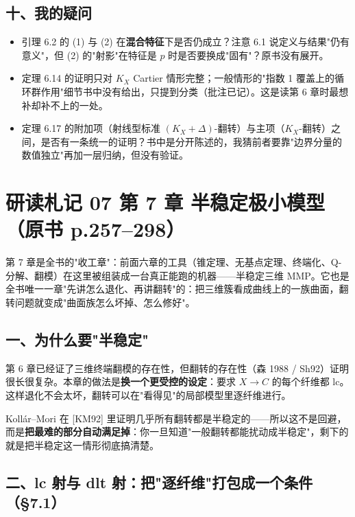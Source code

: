 \subsection*{十、我的疑问}

\begin{itemize}
\item 引理 6.2 的 (1) 与 (2) 在\textbf{混合特征}下是否仍成立？注意 6.1 说定义与结果"仍有意义"，但 (2) 的"射影"在特征是 $p$ 时是否要换成"固有"？原书没有展开。
\item 定理 6.14 的证明只对 $K_X$ Cartier 情形完整；一般情形的"指数 1 覆盖上的循环群作用"细节书中没有给出，只提到分类（批注已记）。这是读第 6 章时最想补却补不上的一处。
\item 定理 6.17 的附加项（射线型标准 $(K_X+\Delta)$-翻转）与主项（$K_X$-翻转）之间，是否有一条统一的证明？书中是分开陈述的，我猜前者要靠"边界分量的数值独立"再加一层归纳，但没有验证。
\end{itemize}

\section*{研读札记 07 \textperiodcentered{} 第 7 章 半稳定极小模型（原书 p.257--298）}

第 7 章是全书的"收工章"：前面六章的工具（锥定理、无基点定理、终端化、Q-分解、翻模）在这里被组装成一台真正能跑的机器——半稳定三维 MMP。它也是全书唯一一章"先讲怎么退化、再讲翻转"的：把三维簇看成曲线上的一族曲面，翻转问题就变成"曲面族怎么坏掉、怎么修好"。

\subsection*{一、为什么要"半稳定"}

第 6 章已经证了三维终端翻模的存在性，但翻转的存在性（森 1988 / Sh92）证明很长很复杂。本章的做法是\textbf{换一个更受控的设定}：要求 $X\to C$ 的每个纤维都 lc。这样退化不会太坏，翻转可以在"看得见"的局部模型里逐纤维进行。

Kollár--Mori 在 [KM92] 里证明几乎所有翻转都是半稳定的——所以这不是回避，而是\textbf{把最难的部分自动满足掉}：你一旦知道"一般翻转都能扰动成半稳定"，剩下的就是把半稳定这一情形彻底搞清楚。

\subsection*{二、lc 射与 dlt 射：把"逐纤维"打包成一个条件（\S7.1）}

